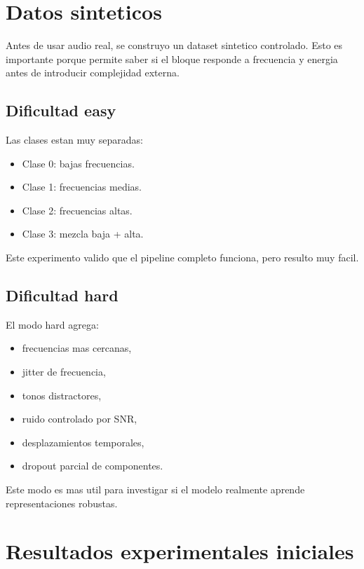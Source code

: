 \documentclass[11pt,letterpaper]{article}
\begin{document}
\section{Datos sinteticos}

Antes de usar audio real, se construyo un dataset sintetico controlado. Esto es
importante porque permite saber si el bloque responde a frecuencia y energia
antes de introducir complejidad externa.

\subsection{Dificultad easy}

Las clases estan muy separadas:

\begin{itemize}[leftmargin=*]
    \item Clase 0: bajas frecuencias.
    \item Clase 1: frecuencias medias.
    \item Clase 2: frecuencias altas.
    \item Clase 3: mezcla baja + alta.
\end{itemize}

Este experimento valido que el pipeline completo funciona, pero resulto muy
facil.

\subsection{Dificultad hard}

El modo hard agrega:

\begin{itemize}[leftmargin=*]
    \item frecuencias mas cercanas,
    \item jitter de frecuencia,
    \item tonos distractores,
    \item ruido controlado por SNR,
    \item desplazamientos temporales,
    \item dropout parcial de componentes.
\end{itemize}

Este modo es mas util para investigar si el modelo realmente aprende
representaciones robustas.

\section{Resultados experimentales iniciales}
\end{document}
